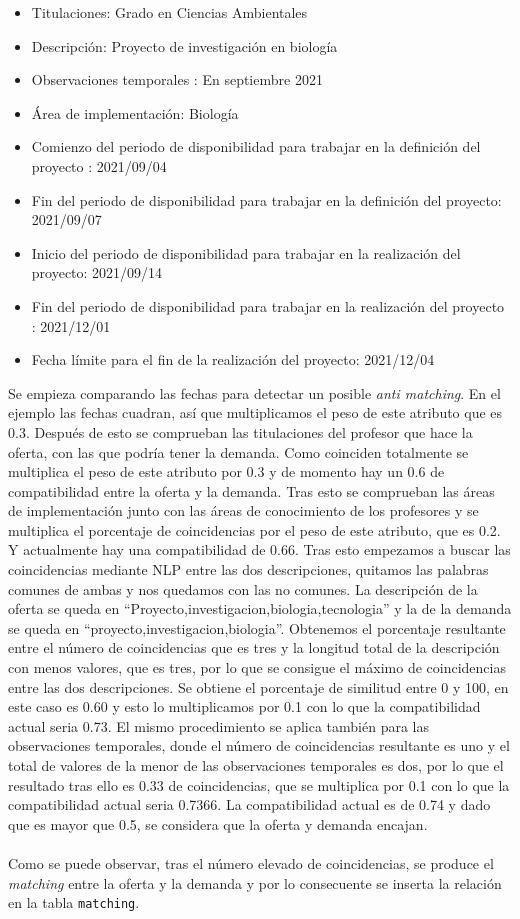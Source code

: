 \documentclass[11pt]{book}
\begin{document}
\begin{itemize} 
	\item Titulaciones: Grado en Ciencias Ambientales
	\item Descripción: Proyecto de investigación en biología
	\item Observaciones temporales : En septiembre 2021
	\item Área de implementación: Biología
	\item Comienzo del periodo de disponibilidad para trabajar en la definición del
	proyecto : 2021/09/04
	\item Fin del periodo de disponibilidad para trabajar en la definición del
	proyecto: 2021/09/07
	\item Inicio del periodo de disponibilidad para trabajar en la realización del
	proyecto: 2021/09/14
	\item Fin del periodo de disponibilidad para trabajar en la realización del
	proyecto : 2021/12/01
	\item Fecha límite para el fin de la realización del proyecto: 2021/12/04
\end{itemize}
Se empieza comparando las fechas para detectar un posible \emph{anti matching}. En el ejemplo las fechas cuadran, así que multiplicamos el peso de este atributo que es 0.3. Después de esto se comprueban las titulaciones del profesor que hace la oferta, con las que podría tener la demanda. Como coinciden totalmente se multiplica el peso de este atributo por 0.3 y de momento hay un 0.6 de compatibilidad entre la oferta y la demanda. Tras esto se comprueban las áreas de implementación junto con las áreas de conocimiento de los profesores y se multiplica el porcentaje de coincidencias por el peso de este atributo, que es 0.2. Y actualmente hay una compatibilidad de 0.66. Tras esto empezamos a buscar las coincidencias mediante NLP entre las dos descripciones, quitamos las palabras comunes de ambas y nos quedamos con las no comunes. La descripción de la oferta se queda en “Proyecto,investigacion,biologia,tecnologia” y la de la demanda se queda en “proyecto,investigacion,biologia”. Obtenemos el porcentaje resultante entre el número de coincidencias que es tres y la longitud total de la descripción con menos valores, que es tres, por lo que se consigue el máximo de coincidencias entre las dos descripciones. Se obtiene el porcentaje de similitud entre 0 y 100,  en este caso es 0.60 y esto lo multiplicamos por 0.1 con lo que la compatibilidad actual seria 0.73. El mismo procedimiento se aplica también para las observaciones temporales, donde el número de coincidencias resultante es uno y el total de valores de la menor de las observaciones temporales es dos, por lo que el resultado tras ello es 0.33 de coincidencias, que se multiplica por 0.1 con lo que la compatibilidad actual seria 0.7366. La compatibilidad actual es de 0.74 y dado que es mayor que 0.5, se considera que la oferta y demanda encajan.\\\\
 Como se puede observar, tras el número elevado de coincidencias, se produce el \emph{matching} entre la oferta y la demanda y por lo consecuente se inserta la relación en la tabla \texttt{matching}.\\\\
\end{document}
